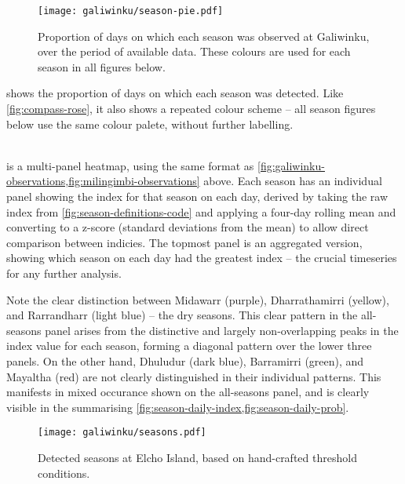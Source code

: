 \begin{wrapfigure}{R}{0.5\textwidth}
    \centering
    \texttt{[image: galiwinku/season-pie.pdf]}
    \caption[Calculated season frequency, Galiwinku]{
        Proportion of days on which each season was observed at
        Galiwinku, over the period of available data.
        These colours are used for each season in all figures below.
        }
    \label{fig:galiwinku-season-pie}
\end{wrapfigure}

 shows the proportion of days on which
each season was detected.  Like \cref{fig:compass-rose}, it also
shows a repeated colour scheme -- all season figures below use the
same colour palete, without further labelling.

~\\

 is a multi-panel heatmap, using the same format
as \cref{fig:galiwinku-observations,fig:milingimbi-observations} above.
Each season has an individual panel showing the index for that season on each
day, derived by taking the raw index from \cref{fig:season-definitions-code}
and applying a four-day rolling mean and converting to a z-score (standard
deviations from the mean) to allow direct comparison between indicies.
%
The topmost panel is an aggregated version, showing which season on each day
had the greatest index -- the crucial timeseries for any further analysis.

Note the clear distinction between Midawarr (purple), Dharrathamirri (yellow),
and Rarrandharr (light blue) -- the dry seasons.  This clear pattern in the
all-seasons panel arises from the distinctive and largely non-overlapping
peaks in the index value for each season, forming a diagonal pattern over
the lower three panels.
%
On the other hand, Dhuludur (dark blue), Barramirri (green), and Mayaltha
(red) are not clearly distinguished in their individual patterns.  This
manifests in mixed occurance shown on the all-seasons panel, and is clearly
visible in the summarising \cref{fig:season-daily-index,fig:season-daily-prob}.


\begin{figure}[p]
    \centering
    \texttt{[image: galiwinku/seasons.pdf]}
    \caption[Detected seasons for Elcho Island]{
        Detected seasons at Elcho Island, based on hand-crafted threshold
        conditions.  
        }
    \label{fig:galiwinku-seasons}
\end{figure}

